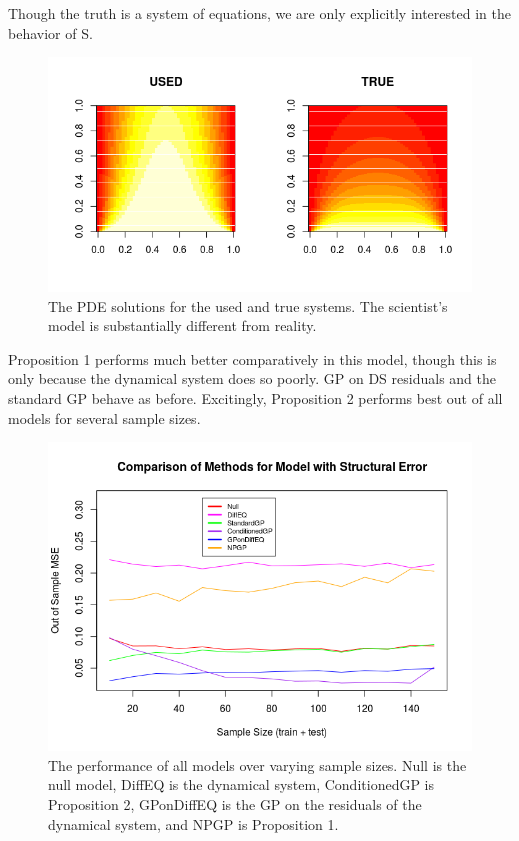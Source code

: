 \documentclass{article}
\begin{document}
	Though the truth is a system of equations, we are only explicitly interested in the behavior of S. 
	
	
	\begin{figure}[H]
		\includegraphics[scale=0.7]{FinalImage4.png}
		\caption{The PDE solutions for the used and true systems. The scientist's model is substantially different from reality.}
		\label{fig9}
	\end{figure}
	
	Proposition 1 performs much better comparatively in this model, though this is only because the dynamical system does so poorly. GP on DS residuals and the standard GP behave as before. Excitingly, Proposition 2 performs best out of all models for several sample sizes.
	
	\begin{figure}[H]
		\includegraphics[scale=0.7]{PrezImage1.png}
		\caption{The performance of all models over varying sample sizes. Null is the null model, DiffEQ is the dynamical system, ConditionedGP is Proposition 2, GPonDiffEQ is the GP on the residuals of the dynamical system, and NPGP is Proposition 1.}
		\label{fig10}
	\end{figure}
	
\end{document}
